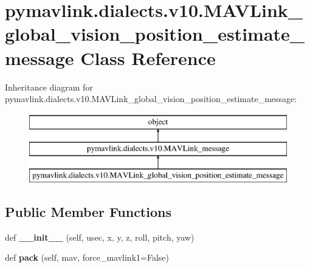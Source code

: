 \hypertarget{classpymavlink_1_1dialects_1_1v10_1_1MAVLink__global__vision__position__estimate__message}{}\section{pymavlink.\+dialects.\+v10.\+M\+A\+V\+Link\+\_\+global\+\_\+vision\+\_\+position\+\_\+estimate\+\_\+message Class Reference}
\label{classpymavlink_1_1dialects_1_1v10_1_1MAVLink__global__vision__position__estimate__message}
Inheritance diagram for pymavlink.\+dialects.\+v10.\+M\+A\+V\+Link\+\_\+global\+\_\+vision\+\_\+position\+\_\+estimate\+\_\+message\+:\begin{figure}[H]
\begin{center}
\leavevmode
\includegraphics[height=3.000000cm]{classpymavlink_1_1dialects_1_1v10_1_1MAVLink__global__vision__position__estimate__message}
\end{center}
\end{figure}
\subsection*{Public Member Functions}
\begin{DoxyCompactItemize}
\item 
\mbox{\label{classpymavlink_1_1dialects_1_1v10_1_1MAVLink__global__vision__position__estimate__message_ab075bb4d414f778da7a88b8637b72a34}} 
def {\bfseries \+\_\+\+\_\+init\+\_\+\+\_\+} (self, usec, x, y, z, roll, pitch, yaw)
\item 
\mbox{\label{classpymavlink_1_1dialects_1_1v10_1_1MAVLink__global__vision__position__estimate__message_a9e7488365771727b6476b144388b3632}} 
def {\bfseries pack} (self, mav, force\+\_\+mavlink1=False)
\end{DoxyCompactItemize}
